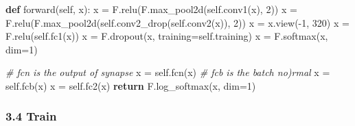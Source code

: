 \documentclass[
]{article}
\newenvironment{Shaded}{}{}
\newcommand{\CommentTok}[1]{\textcolor[rgb]{0.38,0.63,0.69}{\textit{#1}}}
\newcommand{\ControlFlowTok}[1]{\textcolor[rgb]{0.00,0.44,0.13}{\textbf{#1}}}
\newcommand{\DecValTok}[1]{\textcolor[rgb]{0.25,0.63,0.44}{#1}}
\newcommand{\KeywordTok}[1]{\textcolor[rgb]{0.00,0.44,0.13}{\textbf{#1}}}
\newcommand{\NormalTok}[1]{#1}
\newcommand{\OperatorTok}[1]{\textcolor[rgb]{0.40,0.40,0.40}{#1}}
\newcommand{\VariableTok}[1]{\textcolor[rgb]{0.10,0.09,0.49}{#1}}
\begin{document}
\begin{Shaded}
\begin{Highlighting}[]
    \KeywordTok{def}\NormalTok{ forward(}\VariableTok{self}\NormalTok{, x):}
\NormalTok{        x }\OperatorTok{=}\NormalTok{ F.relu(F.max\_pool2d(}\VariableTok{self}\NormalTok{.conv1(x), }\DecValTok{2}\NormalTok{))}
\NormalTok{        x }\OperatorTok{=}\NormalTok{ F.relu(F.max\_pool2d(}\VariableTok{self}\NormalTok{.conv2\_drop(}\VariableTok{self}\NormalTok{.conv2(x)), }\DecValTok{2}\NormalTok{))}
\NormalTok{        x }\OperatorTok{=}\NormalTok{ x.view(}\OperatorTok{{-}}\DecValTok{1}\NormalTok{, }\DecValTok{320}\NormalTok{)}
\NormalTok{        x }\OperatorTok{=}\NormalTok{ F.relu(}\VariableTok{self}\NormalTok{.fc1(x))}
\NormalTok{        x }\OperatorTok{=}\NormalTok{ F.dropout(x, training}\OperatorTok{=}\VariableTok{self}\NormalTok{.training)}
\NormalTok{        x }\OperatorTok{=}\NormalTok{ F.softmax(x, dim}\OperatorTok{=}\DecValTok{1}\NormalTok{)}
        
        \CommentTok{\# fcn is the output of synapse}
\NormalTok{        x }\OperatorTok{=} \VariableTok{self}\NormalTok{.fcn(x)}
        \CommentTok{\# fcb is the batch no)rmal }
\NormalTok{        x }\OperatorTok{=} \VariableTok{self}\NormalTok{.fcb(x)}
\NormalTok{        x }\OperatorTok{=} \VariableTok{self}\NormalTok{.fc2(x)}
        \ControlFlowTok{return}\NormalTok{ F.log\_softmax(x, dim}\OperatorTok{=}\DecValTok{1}\NormalTok{)}
\end{Highlighting}
\end{Shaded}

\hypertarget{header-n63}{%
\subsubsection{3.4 Train}\label{header-n63}}
\end{document}
